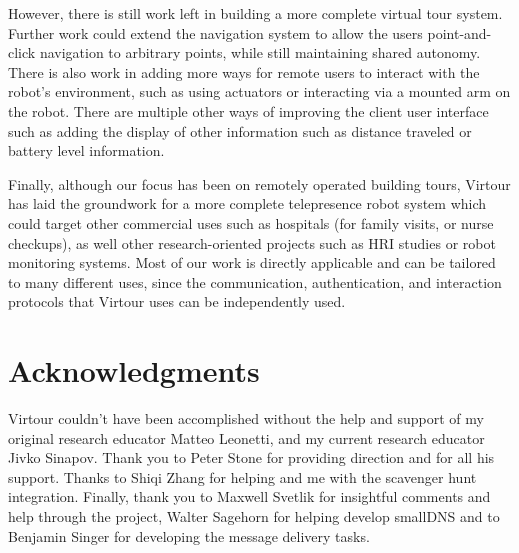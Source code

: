 \documentclass[
  oneside,
  11pt, a4paper,
  footinclude=true,
  headinclude=true,
  cleardoublepage=empty
]{article}
\begin{document}
However, there is still work left in building a more complete virtual tour
system. Further work could extend the navigation system to allow the users
point-and-click navigation to arbitrary points, while still maintaining shared
autonomy. There is also work in adding more ways for remote users to interact
with the robot's environment, such as using actuators or interacting via a
mounted arm on the robot. There are multiple other ways of improving the client
user interface such as adding the display of other information such as distance
traveled or battery level information.

Finally, although our focus has been on remotely operated building tours,
Virtour has laid the groundwork for a more complete telepresence robot system
which could target other commercial uses such as hospitals (for family visits,
or nurse checkups), as well other research-oriented projects such as HRI
studies or robot monitoring systems. Most of our work is directly applicable
and can be tailored to many different uses, since the communication,
authentication, and interaction protocols that Virtour uses can be independently
used.

\section{Acknowledgments}

Virtour couldn't have been accomplished without the help and support of my
original research educator Matteo Leonetti, and my current research educator
Jivko Sinapov. Thank you to Peter Stone for providing direction and for all his
support. Thanks to Shiqi Zhang for helping and me with the scavenger hunt
integration. Finally, thank you to Maxwell Svetlik for insightful comments and
help through the project, Walter Sagehorn for helping develop smallDNS and to
Benjamin Singer for developing the message delivery tasks.

\nocite{*}


    
\end{document}
